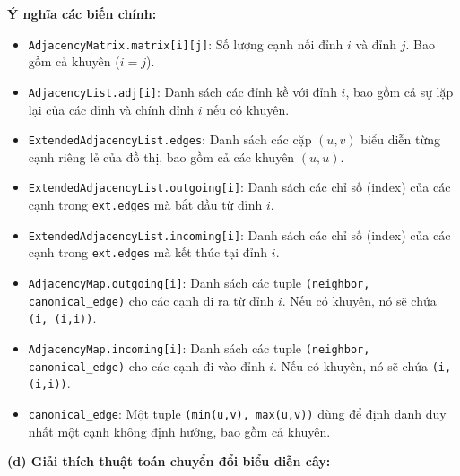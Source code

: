 \documentclass{article}
\begin{document}
\textbf{Ý nghĩa các biến chính:}

\begin{itemize}
    \item \texttt{AdjacencyMatrix.matrix[i][j]}: Số lượng cạnh nối đỉnh $i$ và đỉnh $j$. Bao gồm cả khuyên ($i=j$).
    \item \texttt{AdjacencyList.adj[i]}: Danh sách các đỉnh kề với đỉnh $i$, bao gồm cả sự lặp lại của các đỉnh và chính đỉnh $i$ nếu có khuyên.
    \item \texttt{ExtendedAdjacencyList.edges}: Danh sách các cặp $(u,v)$ biểu diễn từng cạnh riêng lẻ của đồ thị, bao gồm cả các khuyên $(u,u)$.
    \item \texttt{ExtendedAdjacencyList.outgoing[i]}: Danh sách các chỉ số (index) của các cạnh trong \texttt{ext.edges} mà bắt đầu từ đỉnh $i$.
    \item \texttt{ExtendedAdjacencyList.incoming[i]}: Danh sách các chỉ số (index) của các cạnh trong \texttt{ext.edges} mà kết thúc tại đỉnh $i$.
    \item \texttt{AdjacencyMap.outgoing[i]}: Danh sách các tuple \texttt{(neighbor, canonical\_edge)} cho các cạnh đi ra từ đỉnh $i$. Nếu có khuyên, nó sẽ chứa \texttt{(i, (i,i))}.
    \item \texttt{AdjacencyMap.incoming[i]}: Danh sách các tuple \texttt{(neighbor, canonical\_edge)} cho các cạnh đi vào đỉnh $i$. Nếu có khuyên, nó sẽ chứa \texttt{(i, (i,i))}.
    \item \texttt{canonical\_edge}: Một tuple \texttt{(min(u,v), max(u,v))} dùng để định danh duy nhất một cạnh không định hướng, bao gồm cả khuyên.
\end{itemize}


\textbf{(d) Giải thích thuật toán chuyển đổi biểu diễn cây:}
\end{document}
